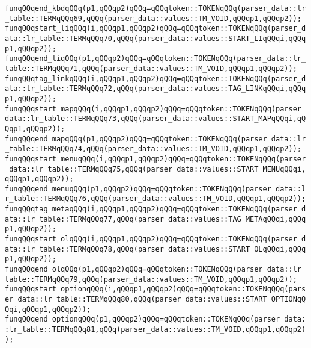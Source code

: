 \verb|funqQQqend_kbdqQQq(p1,qQQqp2)qQQq=qQQqtoken::TOKENqQQq(parser_data::lr_table::TERMqQQq69,qQQq(parser_data::values::TM_VOID,qQQqp1,qQQqp2));|\newline
\verb|funqQQqstart_liqQQq(i,qQQqp1,qQQqp2)qQQq=qQQqtoken::TOKENqQQq(parser_data::lr_table::TERMqQQq70,qQQq(parser_data::values::START_LIqQQqi,qQQqp1,qQQqp2));|\newline
\verb|funqQQqend_liqQQq(p1,qQQqp2)qQQq=qQQqtoken::TOKENqQQq(parser_data::lr_table::TERMqQQq71,qQQq(parser_data::values::TM_VOID,qQQqp1,qQQqp2));|\newline
\verb|funqQQqtag_linkqQQq(i,qQQqp1,qQQqp2)qQQq=qQQqtoken::TOKENqQQq(parser_data::lr_table::TERMqQQq72,qQQq(parser_data::values::TAG_LINKqQQqi,qQQqp1,qQQqp2));|\newline
\verb|funqQQqstart_mapqQQq(i,qQQqp1,qQQqp2)qQQq=qQQqtoken::TOKENqQQq(parser_data::lr_table::TERMqQQq73,qQQq(parser_data::values::START_MAPqQQqi,qQQqp1,qQQqp2));|\newline
\verb|funqQQqend_mapqQQq(p1,qQQqp2)qQQq=qQQqtoken::TOKENqQQq(parser_data::lr_table::TERMqQQq74,qQQq(parser_data::values::TM_VOID,qQQqp1,qQQqp2));|\newline
\verb|funqQQqstart_menuqQQq(i,qQQqp1,qQQqp2)qQQq=qQQqtoken::TOKENqQQq(parser_data::lr_table::TERMqQQq75,qQQq(parser_data::values::START_MENUqQQqi,qQQqp1,qQQqp2));|\newline
\verb|funqQQqend_menuqQQq(p1,qQQqp2)qQQq=qQQqtoken::TOKENqQQq(parser_data::lr_table::TERMqQQq76,qQQq(parser_data::values::TM_VOID,qQQqp1,qQQqp2));|\newline
\verb|funqQQqtag_metaqQQq(i,qQQqp1,qQQqp2)qQQq=qQQqtoken::TOKENqQQq(parser_data::lr_table::TERMqQQq77,qQQq(parser_data::values::TAG_METAqQQqi,qQQqp1,qQQqp2));|\newline
\verb|funqQQqstart_olqQQq(i,qQQqp1,qQQqp2)qQQq=qQQqtoken::TOKENqQQq(parser_data::lr_table::TERMqQQq78,qQQq(parser_data::values::START_OLqQQqi,qQQqp1,qQQqp2));|\newline
\verb|funqQQqend_olqQQq(p1,qQQqp2)qQQq=qQQqtoken::TOKENqQQq(parser_data::lr_table::TERMqQQq79,qQQq(parser_data::values::TM_VOID,qQQqp1,qQQqp2));|\newline
\verb|funqQQqstart_optionqQQq(i,qQQqp1,qQQqp2)qQQq=qQQqtoken::TOKENqQQq(parser_data::lr_table::TERMqQQq80,qQQq(parser_data::values::START_OPTIONqQQqi,qQQqp1,qQQqp2));|\newline
\verb|funqQQqend_optionqQQq(p1,qQQqp2)qQQq=qQQqtoken::TOKENqQQq(parser_data::lr_table::TERMqQQq81,qQQq(parser_data::values::TM_VOID,qQQqp1,qQQqp2));|\newline
